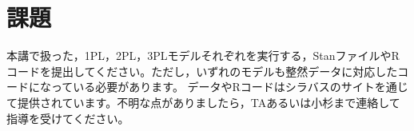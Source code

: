 \documentclass{ltjsbook}
\begin{document}
\section{課題}
本講で扱った，1PL，2PL，3PLモデルそれぞれを実行する，StanファイルやRコードを提出してください。ただし，いずれのモデルも整然データに対応したコードになっている必要があります。
データやRコードはシラバスのサイトを通じて提供されています。不明な点がありましたら，TAあるいは小杉まで連絡して指導を受けてください。
\end{document}
